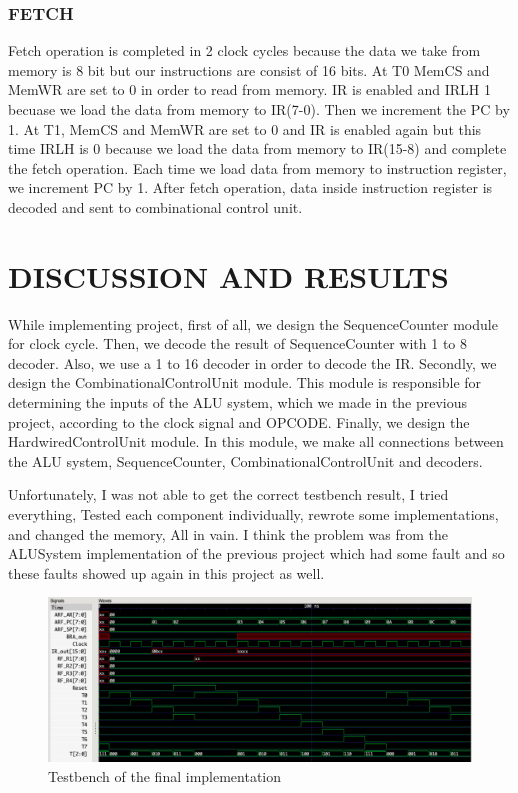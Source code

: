 \documentclass[pdftex,12pt,a4paper]{article}
\begin{document}
\subsubsection{FETCH}
Fetch operation is completed in 2 clock cycles because the data we take from memory is 8 bit but our instructions are consist of 16 bits. At T0 MemCS and MemWR are set to 0 in order to read from memory. IR is enabled and IRLH 1 becuase we load the data from memory to IR(7-0). Then we increment the PC by 1. At T1, MemCS and MemWR are set to 0 and IR is enabled again but this time IRLH is 0 because we load the data from memory to IR(15-8) and complete the fetch operation. Each time we load data from memory to instruction register, we increment PC by 1. After fetch operation, data inside instruction register is decoded and sent to combinational control unit.

\section{DISCUSSION AND RESULTS} 
While implementing project, first of all, we design the SequenceCounter module for clock cycle. Then, we decode the result of SequenceCounter with 1 to 8 decoder. Also, we use a 1 to 16 decoder in order to decode the IR.
Secondly, we design the CombinationalControlUnit module. This module is responsible for determining the inputs of the ALU system, which we made in the previous project, according to the clock signal and OPCODE.
Finally, we design the HardwiredControlUnit module. In this module, we make all connections between the ALU system, SequenceCounter, CombinationalControlUnit and decoders.

Unfortunately, I was not able to get the correct testbench result, I tried everything, Tested each component individually, rewrote some implementations, and changed the memory, All in vain. I think the problem was from the ALUSystem implementation of the previous project which had some fault and so these faults showed up again in this project as well.

\begin{figure}[H]
    \centering
    \includegraphics[width=1\textwidth]{tb.png}
    \caption{Testbench of the final implementation}
    \label{fig:tb}
\end{figure}
\end{document}
